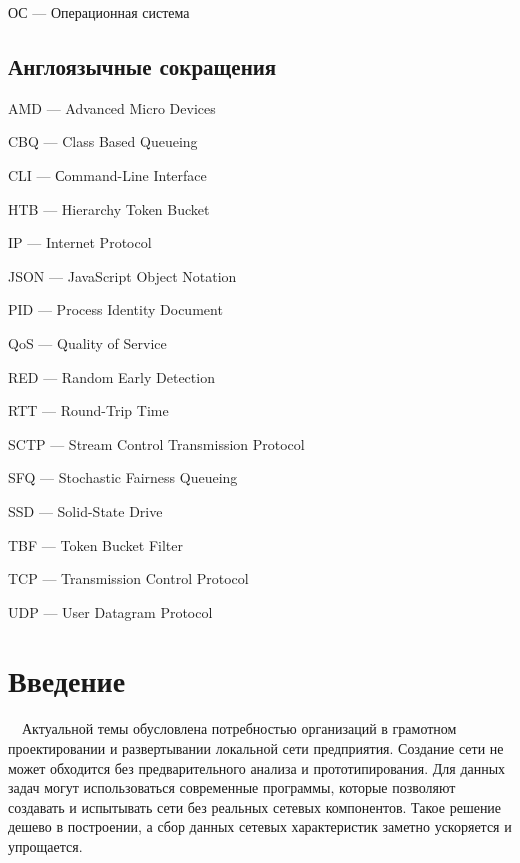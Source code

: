 \documentclass[
  13pt,
  fontsize=13pt,
  russian,
  a4paper,
,captions=tableheading
]{scrreprt}
\begin{document}
ОС --- Операционная система

\hypertarget{ux430ux43dux433ux43bux43eux44fux437ux44bux447ux43dux44bux435-ux441ux43eux43aux440ux430ux449ux435ux43dux438ux44f}{%
\section*{Англоязычные
сокращения}\label{ux430ux43dux433ux43bux43eux44fux437ux44bux447ux43dux44bux435-ux441ux43eux43aux440ux430ux449ux435ux43dux438ux44f}}

AMD --- Advanced Micro Devices

CBQ --- Class Based Queueing

CLI --- Сommand-Line Interface

HTB --- Hierarchy Token Bucket

IP --- Internet Protocol

JSON --- JavaScript Object Notation

PID --- Process Identity Document

QoS --- Quality of Service

RED --- Random Early Detection

RTT --- Round-Trip Time

SCTP --- Stream Control Transmission Protocol

SFQ --- Stochastic Fairness Queueing

SSD --- Solid-State Drive

TBF --- Token Bucket Filter

TCP --- Transmission Control Protocol

UDP --- User Datagram Protocol

\hypertarget{ux432ux432ux435ux434ux435ux43dux438ux435}{%
\chapter*{Введение}\label{ux432ux432ux435ux434ux435ux43dux438ux435}}

\(\quad\)Актуальной темы обусловлена потребностью организаций в
грамотном проектировании и развертывании локальной сети предприятия.
Создание сети не может обходится без предварительного анализа и
прототипирования. Для данных задач могут использоваться современные
программы, которые позволяют создавать и испытывать сети без реальных
сетевых компонентов. Такое решение дешево в построении, а сбор данных
сетевых характеристик заметно ускоряется и упрощается.
\end{document}
